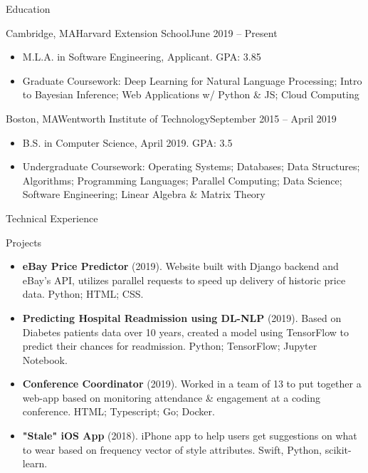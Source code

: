 \documentclass[]{mcdowellcv}
\begin{document}
	\begin{cvsection}{Education}
		\begin{cvsubsection}{Cambridge, MA}{Harvard Extension School}{June 2019 -- Present}
		
			\begin{itemize}
				\item M.L.A. in Software Engineering, Applicant. GPA: 3.85
				\item Graduate Coursework: Deep Learning for Natural Language Processing; Intro to Bayesian Inference; Web Applications w/ Python \& JS; Cloud Computing
				\end{itemize}
		\end{cvsubsection}
		\begin{cvsubsection}{Boston, MA}{Wentworth Institute of Technology}{September 2015 -- April 2019}
		\vspace{2mm}
			\begin{itemize}
				\item B.S. in Computer Science, April 2019. GPA: 3.5
				\item Undergraduate Coursework: Operating Systems; Databases; Data Structures; Algorithms; Programming Languages; Parallel Computing; Data Science; Software Engineering; Linear Algebra \& Matrix Theory
			\end{itemize}
		\end{cvsubsection}
	\end{cvsection}
	
	\begin{cvsection}{Technical Experience}
		\begin{cvsubsection}{Projects}{}{}
			\begin{itemize}
				\item \textbf{eBay Price Predictor} (2019). Website built with Django backend and eBay's API, utilizes parallel requests to speed up delivery of historic price data. Python; HTML; CSS.
				\item \textbf{Predicting Hospital Readmission using DL-NLP} (2019). Based on Diabetes patients data over 10 years, created a model using TensorFlow to predict their chances for readmission. Python; TensorFlow; Jupyter Notebook.
				\item \textbf{Conference Coordinator} (2019). Worked in a team of 13 to put together a web-app based on monitoring attendance \& engagement at a coding conference. HTML; Typescript; Go; Docker.
				\item \textbf{"Stale" iOS App} (2018). iPhone app to help users get suggestions on what to wear based on frequency vector of style attributes. Swift, Python, scikit-learn.
			\end{itemize}
		\end{cvsubsection}
	\end{cvsection}
	
\end{document}
